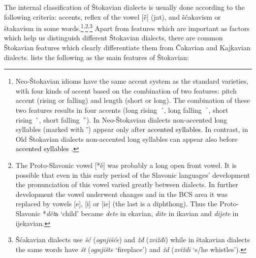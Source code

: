 The internal classification of Štokavian dialects is usually done according to the following criteria: accents, reflex of the vowel [ě] (jat), and šćakavism or štakavism in some words.\footnote{Neo-Štokavian idioms have the same accent system as the standard varieties, with four kinds of accent based on the combination of two features: pitch accent (rising or falling) and length (short or long). The combination of these two features results in four accents (long rising\ \  ́, long falling\ \  ̑, short rising\ \  ̀, short falling\ \  ̏). In Neo-Štokavian dialects non-accented long syllables (marked with ˉ) appear only after \textcolor{black}{accented syllables}. In contrast, in Old Štokavian dialects non-accented long syllables can appear also before \textcolor{black}{accented syllables} \citep[cf.][23]{Lisac03}.}\textsuperscript{,}\footnote{The Proto-Slavonic vowel [*ě] was probably a long open front vowel. It is possible that even in this early period of the Slavonic languages’ development the pronunciation of this vowel varied greatly between dialects. In further development the vowel underwent changes and in the BCS area it was replaced by vowels [e], [i] or [ie] (the last is a diphthong). Thus the Proto-Slavonic *\textit{dětь} ‘child’ became \textit{dete} in ekavian, \textit{dite} in ikavian and \textit{dijete} in ijekavian.}\textsuperscript{,}\footnote{Šćakavian dialects use \textit{šć} (\textit{ognjišće}) and \textit{žđ} (\textit{zvižđi}) while in štakavian dialects the same words have \textit{št} (\textit{ognjište} ‘fireplace’) and \textit{žd} (\textit{zviždi} ‘s/he whistles’).} Apart from features which are important as factors which help us distinguish different Štokavian dialects, there are common Štokavian features which clearly differentiate them from Čakavian and Kajkavian dialects. \citet[17f]{Lisac03} lists the following as the main features of Štokavian:

